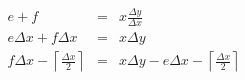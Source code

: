 \message{ !name(circ.tex)}\documentclass[a4paper,twocolumn]{article}
\begin{document}
\begin{eqnarray}
e + f &=& x \frac{\Delta y}{\Delta x}\nonumber\\
e \Delta x + f \Delta x &=& x \Delta y\nonumber\\
f \Delta x - \left\lceil\frac{\Delta x}2\right\rceil &=& 
x \Delta y - e \Delta x - \left\lceil\frac{\Delta x}2\right\rceil \label{lgii}
\end{eqnarray}
\end{document}
